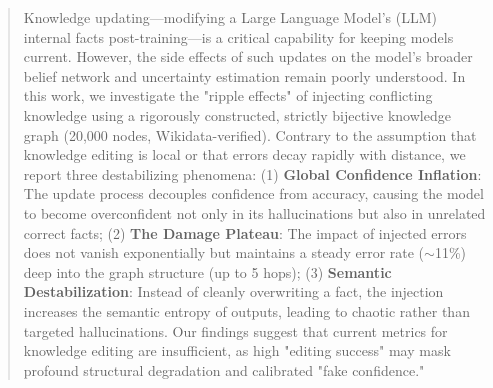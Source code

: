 \begin{abstract}
Knowledge updating---modifying a Large Language Model's (LLM) internal facts post-training---is a critical capability for keeping models current. However, the side effects of such updates on the model's broader belief network and uncertainty estimation remain poorly understood. 
In this work, we investigate the "ripple effects" of injecting conflicting knowledge using a rigorously constructed, strictly bijective knowledge graph (20,000 nodes, Wikidata-verified). 
Contrary to the assumption that knowledge editing is local or that errors decay rapidly with distance, we report three destabilizing phenomena: 
(1) \textbf{Global Confidence Inflation}: The update process decouples confidence from accuracy, causing the model to become overconfident not only in its hallucinations but also in unrelated correct facts; 
(2) \textbf{The Damage Plateau}: The impact of injected errors does not vanish exponentially but maintains a steady error rate ($\sim$11\%) deep into the graph structure (up to 5 hops); 
(3) \textbf{Semantic Destabilization}: Instead of cleanly overwriting a fact, the injection increases the semantic entropy of outputs, leading to chaotic rather than targeted hallucinations. 
Our findings suggest that current metrics for knowledge editing are insufficient, as high "editing success" may mask profound structural degradation and calibrated "fake confidence."
\end{abstract}
